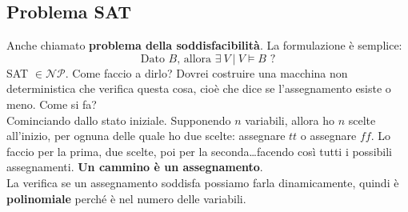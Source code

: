 \documentclass[10pt]{book}
\begin{document}
\subsection{Problema SAT}
Anche chiamato \textbf{problema della soddisfacibilità}. La formulazione è semplice:
$$\text{Dato }B\text{, allora }\exists\:V\:|\:V\vDash B\text{ ?}$$
SAT $\in\mathscr{NP}$. Come faccio a dirlo? Dovrei costruire una macchina non deterministica che verifica questa cosa, cioè che dice se l'assegnamento esiste o meno. Come si fa?\\
Cominciando dallo stato iniziale. Supponendo $n$ variabili, allora ho $n$ scelte all'inizio, per ognuna delle quale ho due scelte: assegnare $tt$ o assegnare $ff$. Lo faccio per la prima, due scelte, poi per la seconda\ldots facendo così tutti i possibili assegnamenti. \textbf{Un cammino è un assegnamento}.\\
La verifica se un assegnamento soddisfa possiamo farla dinamicamente, quindi è \textbf{polinomiale} perché è nel numero delle variabili.
\end{document}
